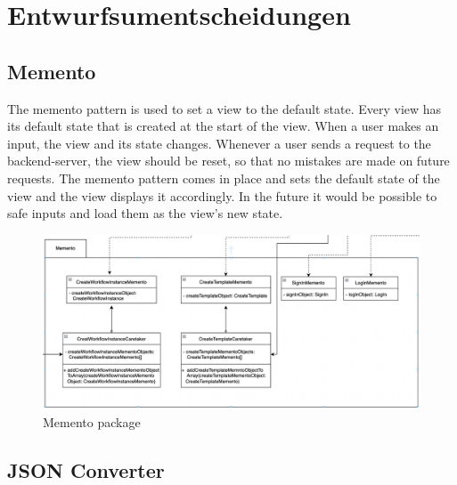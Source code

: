 \section{Entwurfsumentscheidungen}
    	
  
\subsection{Memento} 	
    	 The memento pattern is used to set a view to the default state. Every view has its default
    	 state that is created at the start of the view. When a user makes an input, the view and
    	 its state changes. Whenever a user sends a request to the backend-server, the view should
    	 be reset, so that no mistakes are made on future requests. The memento pattern comes in
    	 place and sets the default state of the view and the view displays it accordingly. In
    	 the future it would be possible to safe inputs and load them as the view's new state.
    	\begin{figure}[H]
            \label{API}
            \centerline{\includegraphics[scale=0.5]{res/Memento.png}}
            \caption{Memento package}
    	\end{figure}
    	
\subsection{JSON Converter}

